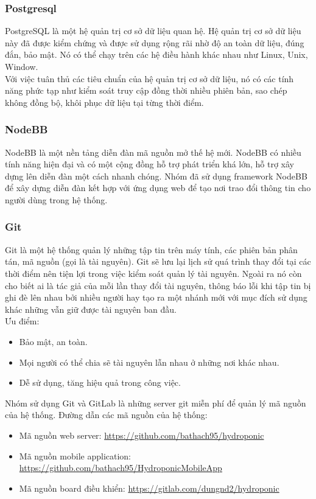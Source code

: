 \documentclass[a4paper,12pt,oneside]{article}
\begin{document}
\subsubsection{Postgresql}
\noindent PostgreSQL là một hệ quản trị cơ sở dữ liệu quan hệ. Hệ quản trị cơ sở dữ liệu này đã được kiểm chứng và được sử dụng rộng rãi nhờ độ an toàn dữ liệu, đúng đắn, bảo mật. Nó có thể chạy trên các hệ điều hành khác nhau như Linux, Unix, Window. \\
Với việc tuân thủ các tiêu chuẩn của hệ quản trị cơ sở dữ liệu, nó có các tính năng phức tạp như kiểm soát truy cập đồng thời nhiều phiên bản, sao chép không đồng bộ, khôi phục dữ liệu tại từng thời điểm\cite{sql}.

\subsubsection{NodeBB}
\noindent NodeBB là một nền tảng diễn đàn mã nguồn mở thế hệ mới. NodeBB có nhiều tính năng hiện đại và có một cộng đồng hỗ trợ phát triển khá lớn, hỗ trợ xây dựng lên diễn đàn một cách nhanh chóng. Nhóm đã sử dụng framework NodeBB để xây dựng diễn đàn kết hợp với ứng dụng web để tạo nơi trao đổi thông tin cho người dùng trong hệ thống. 

\subsubsection{Git}
\noindent Git là một hệ thống quản lý những tập tin trên máy tính, các phiên bản phân tán, mã nguồn (gọi là tài nguyên). Git sẽ lưu lại lịch sử quá trình thay đổi tại các thời điểm nên tiện lợi trong việc kiểm soát quản lý tài nguyên. Ngoài ra nó còn cho biết ai là tác giả của mỗi lần thay đổi tài nguyên, thông báo lỗi khi tập tin bị ghi đè lên nhau bởi nhiều người hay tạo ra một nhánh mới với mục đích sử dụng khác những vẫn giữ được tài nguyên ban đầu.\\ 
Ưu điểm:
\begin{itemize}
\item Bảo mật, an toàn.
\item Mọi người có thể chia sẽ tài nguyên lẫn nhau ở những nơi khác nhau.
\item Dễ sử dụng, tăng hiệu quả trong công việc.
\end{itemize}

\noindent Nhóm sử dụng Git và GitLab là những server git miễn phí để quản lý mã nguồn của hệ thống. Đường dẫn các mã nguồn của hệ thống:
\begin{itemize}
\item Mã nguồn web server: \url{https://github.com/bathach95/hydroponic}
\item Mã nguồn mobile application: \url{https://github.com/bathach95/HydroponicMobileApp}
\item Mã nguồn board điều khiển: \url{https://gitlab.com/dungnd2/hydroponic}
\end{itemize}
\end{document}
